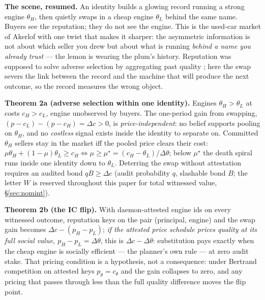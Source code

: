 \documentclass[11pt,a4paper]{article}
\begin{document}
\textbf{The scene, resumed.} An identity builds a glowing record running a strong engine $\theta_H$, then quietly swaps in a cheap
engine $\theta_L$ behind the same name. Buyers see the reputation; they do not see the engine. This is the used-car market of
Akerlof \cite{akerlof} with one twist that makes it sharper: the asymmetric information is not about which seller you drew but
about what is running \emph{behind a name you already trust} --- the lemon is wearing the plum's history. Reputation was supposed
to solve adverse selection by aggregating past quality \cite{mailath-samuelson}; here the swap severs the link between the record
and the machine that will produce the next outcome, so the record measures the wrong object.

\begin{thebox}
\textbf{Theorem 2a (adverse selection within one identity).} Engines $\theta_H>\theta_L$ at costs $c_H>c_L$, engine unobserved by
buyers. The one-period gain from swapping, $(p-c_L)-(p-c_H)=\Delta c>0$, is \emph{price-independent}: no belief supports pooling
on $\theta_H$, and no \emph{costless} signal exists inside the identity to separate on. Committed $\theta_H$ sellers stay in the market iff the pooled price clears their cost:
$\mu\theta_H+(1-\mu)\theta_L\ge c_H\iff \mu\ge\mu^\star=(c_H-\theta_L)/\Delta\theta$; below $\mu^\star$ the death spiral runs
inside one identity down to $\theta_L$. Deterring the swap without attestation requires an audited bond $qB\ge\Delta c$ (audit
probability $q$, slashable bond $B$; the letter $W$ is reserved throughout this paper for total witnessed value,
\S\ref{sec:nomint}).

\textbf{Theorem 2b (the IC flip).} With daemon-attested engine ids on every witnessed outcome, reputation keys on the pair
(principal, engine) and the swap gain becomes $\Delta c-(p_H-p_L)$; \emph{if the attested price schedule prices quality at its
full social value, $p_H-p_L=\Delta\theta$}, this is $\Delta c-\Delta\theta$: substitution pays exactly when the cheap engine is
socially efficient --- the planner's own rule --- at zero audit stake. That pricing condition is a hypothesis, not a
consequence: under Bertrand competition on attested keys $p_\theta=c_\theta$ and the gain collapses to zero, and any pricing that
passes through less than the full quality difference moves the flip point.


\end{thebox}
\end{document}
